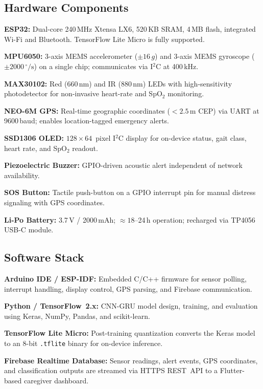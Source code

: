 \documentclass[conference]{IEEEtran}
\begin{document}
\subsection{Hardware Components}

\textbf{ESP32:} Dual-core 240\,MHz Xtensa LX6, 520\,KB SRAM, 4\,MB flash,
integrated Wi-Fi and Bluetooth. TensorFlow Lite Micro is fully supported.

\textbf{MPU6050:} 3-axis MEMS accelerometer ($\pm16\,g$) and 3-axis MEMS
gyroscope ($\pm2000\,^\circ/\mathrm{s}$) on a single chip; communicates
via I$^2$C at 400\,kHz.

\textbf{MAX30102:} Red (660\,nm) and IR (880\,nm) LEDs with
high-sensitivity photodetector for non-invasive heart-rate and SpO$_2$
monitoring.

\textbf{NEO-6M GPS:} Real-time geographic coordinates ($<2.5$\,m CEP) via
UART at 9600\,baud; enables location-tagged emergency alerts.

\textbf{SSD1306 OLED:} $128 \times 64$~pixel I$^2$C display for on-device
status, gait class, heart rate, and SpO$_2$ readout.

\textbf{Piezoelectric Buzzer:} GPIO-driven acoustic alert independent of
network availability.

\textbf{SOS Button:} Tactile push-button on a GPIO interrupt pin for manual
distress signaling with GPS coordinates.

\textbf{Li-Po Battery:} 3.7\,V / 2000\,mAh; ${\approx}18$--24\,h
operation; recharged via TP4056 USB-C module.

\subsection{Software Stack}

\textbf{Arduino IDE / ESP-IDF:} Embedded C/C++ firmware for sensor polling,
interrupt handling, display control, GPS parsing, and Firebase
communication.

\textbf{Python / TensorFlow~2.x:} CNN-GRU model design, training, and
evaluation using Keras, NumPy, Pandas, and scikit-learn.

\textbf{TensorFlow Lite Micro:} Post-training quantization converts the
Keras model to an 8-bit \texttt{.tflite} binary for on-device inference.

\textbf{Firebase Realtime Database:} Sensor readings, alert events, GPS
coordinates, and classification outputs are streamed via HTTPS REST~API to
a Flutter-based caregiver dashboard.
\end{document}
